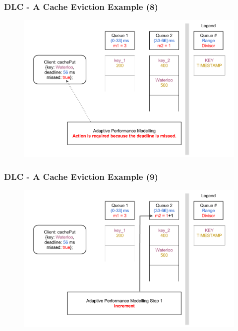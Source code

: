 \documentclass{beamer}
\begin{document}
\begin{frame}
  \frametitle{DLC - A Cache Eviction Example (8)}
  \begin{figure}
    \begin{center}
      \centerline{\includegraphics[scale=0.37]{img/DLC_V8_08.png}}
    \end{center}
  \end{figure}
\end{frame}

\begin{frame}
  \frametitle{DLC - A Cache Eviction Example (9)}
  \begin{figure}
    \begin{center}
      \centerline{\includegraphics[scale=0.37]{img/DLC_V8_09.png}}
    \end{center}
  \end{figure}
\end{frame}
\end{document}
